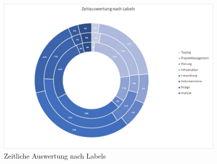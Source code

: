 \begin{figure}
	\centering
	\includegraphics[width=1\linewidth]{./img/zeitauswertung/ZeitauswertungLabel}
	\caption{Zeitliche Auswertung nach Labels}
	\label{fig:comparison-labels}
\end{figure}